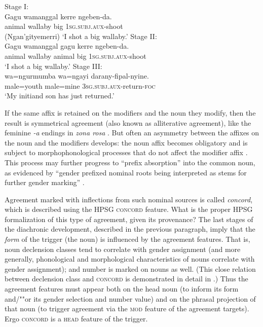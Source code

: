 \documentclass[output=paper,biblatex,babelshorthands,newtxmath,draftmode,colorlinks,citecolor=brown]{langscibook}
\begin{document}
\begin{exe}
\ex
\begin{xlist}
\ex \label{wallaby1} Stage I: \\
\gll Gagu   wamanggal kerre ngeben-da. \\
     animal wallaby   big   1\textsc{sg.subj.aux}-shoot \\\hfill(Ngan’gityemerri)
\glt `I shot a big wallaby.’	
\ex \label{wallaby2} Stage II: \\
\gll 	Gagu	   wamanggal	   gagu	kerre	    ngeben-da. \\
	animal	wallaby	  animal     	big	1\textsc{sg.subj.aux}-shoot\\
\glt `I shot a big wallaby.’
\pagebreak
\ex \label{wallaby3} Stage III: \\
\gll 	wa=ngurmumba	wa=ngayi	darany-fipal-nyine. \\
	male=youth	male=mine	\textsc{3sg.subj.aux}-return-\textsc{foc} \\
\glt 	`My initiand son has just returned.’ 
\end{xlist}
\end{exe}

\largerpage
\noindent
If the same affix is retained on the modifiers and the noun they modify, then the result is symmetrical agreement (also known as alliterative agreement), like the feminine \textit{-a} endings in  \textit{zona rosa} \citep[87--88]{corbett:2006}.  But often an asymmetry between the affixes on the  noun and the modifiers develops: the noun affix becomes obligatory and is subject to morphophonological processes that do not affect the modifier affix \citep[216]{reid:1997}.    This process may further progress to ``prefix absorption'' into the common noun, as evidenced by ``gender prefixed nominal roots being interpreted as stems for further gender marking'' \citep[217]{reid:1997}.


Agreement marked with inflections from such nominal sources is called \emph{concord}, which is described using the HPSG \textsc{concord} feature.  What is the proper HPSG formalization of this type of agreement, given its provenance?   The last stages of the diachronic development, described in the previous paragraph, imply that the \textit{form} of the trigger (the noun) is influenced by the agreement features.  That is, noun declension classes tend to correlate with gender assignment (and more generally, phonological and morphological characteristics of nouns correlate with gender assignment); and number is marked on nouns as well.  (This close relation between declension class and \textsc{concord} is demonstrated in detail in \citealt[Chapter~2]{Wechsler+Zlatic:2003}.) Thus the agreement features must appear both on the head noun (to inform its form and/""or its gender selection and number value) and on the phrasal projection of that noun (to trigger agreement via the \textsc{mod} feature of the agreement targets).  Ergo \textsc{concord} is a \textsc{head} feature of the trigger.  
\end{document}
